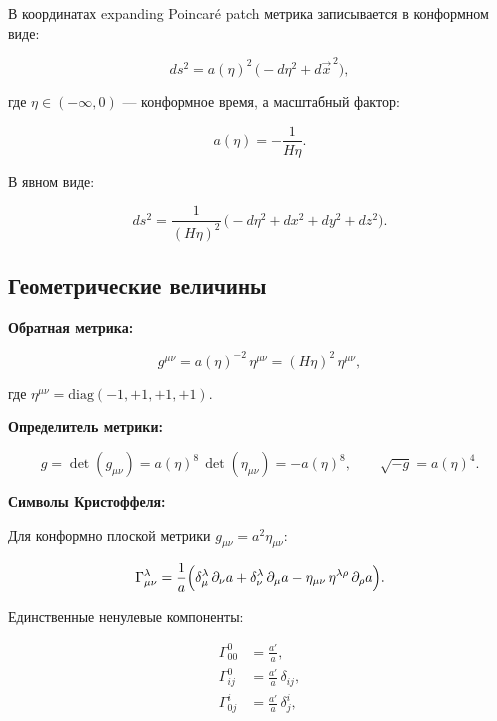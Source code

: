 \documentclass[12pt,a4paper]{article}
\begin{document}
В координатах expanding Poincar\'e patch метрика записывается в конформном виде:

\begin{equation}
ds^2 = a(\eta)^2\,\bigl(-d\eta^2 + d\vec{x}^{\,2}\bigr),
\end{equation}

где $\eta \in (-\infty, 0)$ — конформное время, а масштабный фактор:

\begin{equation}
a(\eta) = -\frac{1}{H\eta}.
\end{equation}

В явном виде:

\begin{equation}
ds^2 = \frac{1}{(H\eta)^2}\,\bigl(-d\eta^2 + dx^2 + dy^2 + dz^2\bigr).
\end{equation}

\subsection{Геометрические величины}

\textbf{Обратная метрика:}

\begin{equation}
g^{\mu\nu} = a(\eta)^{-2}\,\eta^{\mu\nu} = (H\eta)^2\,\eta^{\mu\nu},
\end{equation}

где $\eta^{\mu\nu} = \text{diag}(-1, +1, +1, +1)$.

\textbf{Определитель метрики:}

\begin{equation}
g = \det(g_{\mu\nu}) = a(\eta)^8\,\det(\eta_{\mu\nu}) = -a(\eta)^8,
\qquad \sqrt{-g} = a(\eta)^4.
\end{equation}

\textbf{Символы Кристоффеля:}

Для конформно плоской метрики $g_{\mu\nu} = a^2\eta_{\mu\nu}$:

\begin{equation}
\Gamma^\lambda_{\mu\nu} = \frac{1}{a}\Bigl(\delta^\lambda_\mu\,\partial_\nu a + \delta^\lambda_\nu\,\partial_\mu a - \eta_{\mu\nu}\,\eta^{\lambda\rho}\,\partial_\rho a\Bigr).
\end{equation}

Единственные ненулевые компоненты:

\begin{align}
\Gamma^0_{00} &= \frac{a'}{a}, \\
\Gamma^0_{ij} &= \frac{a'}{a}\,\delta_{ij}, \\
\Gamma^i_{0j} &= \frac{a'}{a}\,\delta^i_j,
\end{align}
\end{document}
